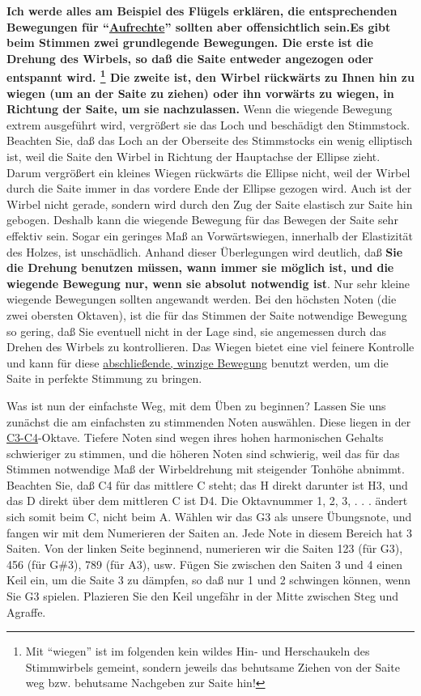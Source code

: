{\normalsize \textbf{Ich werde alles am Beispiel des Flügels erklären, die entsprechenden Bewegungen für \enquote{\hyperlink{upright}{Aufrechte}} sollten aber offensichtlich sein.}}\textbf{Es gibt beim Stimmen zwei grundlegende Bewegungen.
 Die erste ist die Drehung des Wirbels, so daß die Saite entweder angezogen oder entspannt wird.
 \footnote{Mit \enquote{wiegen} ist im folgenden kein wildes Hin- und Herschaukeln des Stimmwirbels gemeint, sondern jeweils das behutsame Ziehen von der Saite weg bzw. behutsame Nachgeben zur Saite hin!}
 Die zweite ist, den Wirbel rückwärts zu Ihnen hin zu wiegen (um an der Saite zu ziehen) oder ihn vorwärts zu wiegen, in Richtung der Saite, um sie nachzulassen.}
 Wenn die wiegende Bewegung extrem ausgeführt wird, vergrößert sie das Loch und beschädigt den Stimmstock.
 Beachten Sie, daß das Loch an der Oberseite des Stimmstocks ein wenig elliptisch ist, weil die Saite den Wirbel in Richtung der Hauptachse der Ellipse zieht.
 Darum vergrößert ein kleines Wiegen rückwärts die Ellipse nicht, weil der Wirbel durch die Saite immer in das vordere Ende der Ellipse gezogen wird.
 Auch ist der Wirbel nicht gerade, sondern wird durch den Zug der Saite elastisch zur Saite hin gebogen.
 Deshalb kann die wiegende Bewegung für das Bewegen der Saite sehr effektiv sein.
 Sogar ein geringes Maß an Vorwärtswiegen, innerhalb der Elastizität des Holzes, ist unschädlich.
 Anhand dieser Überlegungen wird deutlich, daß \textbf{Sie die Drehung benutzen müssen, wann immer sie möglich ist, und die wiegende Bewegung nur, wenn sie absolut notwendig ist}.
 Nur sehr kleine wiegende Bewegungen sollten angewandt werden.
 Bei den höchsten Noten (die zwei obersten Oktaven), ist die für das Stimmen der Saite notwendige Bewegung so gering, daß Sie eventuell nicht in der Lage sind, sie angemessen durch das Drehen des Wirbels zu kontrollieren.
 Das Wiegen bietet eine viel feinere Kontrolle und kann für diese \hyperlink{c2_5_infi}{abschließende, winzige Bewegung} benutzt werden, um die Saite in perfekte Stimmung zu bringen.
 

Was ist nun der einfachste Weg, mit dem Üben zu beginnen?
 Lassen Sie uns zunächst die am einfachsten zu stimmenden Noten auswählen.
 Diese liegen in der \hyperlink{Noten}{C3-C4}-Oktave.
 Tiefere Noten sind wegen ihres hohen harmonischen Gehalts schwieriger zu stimmen, und die höheren Noten sind schwierig, weil das für das Stimmen notwendige Maß der Wirbeldrehung mit steigender Tonhöhe abnimmt.
 Beachten Sie, daß C4 für das mittlere C steht; das H direkt darunter ist H3, und das D direkt über dem mittleren C ist D4.
 Die Oktavnummer 1, 2, 3, . . . ändert sich somit beim C, nicht beim A.
 Wählen wir das G3 als unsere Übungsnote, und fangen wir mit dem Numerieren der Saiten an.
 Jede Note in diesem Bereich hat 3 Saiten.
 Von der linken Seite beginnend, numerieren wir die Saiten 123 (für G3), 456 (für G\#3), 789 (für A3), usw.
 Fügen Sie zwischen den Saiten 3 und 4 einen Keil ein, um die Saite 3 zu dämpfen, so daß nur 1 und 2 schwingen können, wenn Sie G3 spielen.
 Plazieren Sie den Keil ungefähr in der Mitte zwischen Steg und Agraffe.
 

